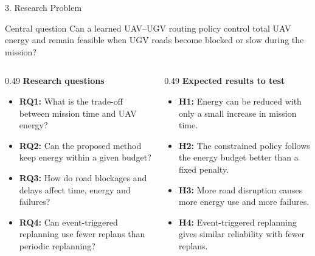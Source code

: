 \documentclass[aspectratio=169,10pt]{beamer}
\begin{document}
\begin{frame}{3. Research Problem}
\small
\begin{block}{Central question}
Can a learned UAV--UGV routing policy control total UAV energy and remain feasible when UGV roads
become blocked or slow during the mission?
\end{block}
\vspace{-1mm}
\scriptsize
\begin{columns}[T]
\begin{column}{0.49\textwidth}
\textbf{Research questions}
\begin{itemize}\setlength{\itemsep}{1mm}
  \item \textbf{RQ1:} What is the trade-off between mission time and UAV energy?
  \item \textbf{RQ2:} Can the proposed method keep energy within a given budget?
  \item \textbf{RQ3:} How do road blockages and delays affect time, energy and failures?
  \item \textbf{RQ4:} Can event-triggered replanning use fewer replans than periodic replanning?
\end{itemize}
\end{column}
\begin{column}{0.49\textwidth}
\textbf{Expected results to test}
\begin{itemize}\setlength{\itemsep}{1mm}
  \item \textbf{H1:} Energy can be reduced with only a small increase in mission time.
  \item \textbf{H2:} The constrained policy follows the energy budget better than a fixed penalty.
  \item \textbf{H3:} More road disruption causes more energy use and more failures.
  \item \textbf{H4:} Event-triggered replanning gives similar reliability with fewer replans.
\end{itemize}
\end{column}
\end{columns}
\end{frame}
\end{document}
